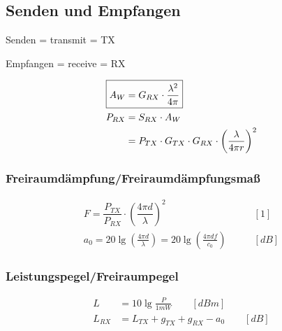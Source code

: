 \subsection{Senden und Empfangen}
\begin{description}
    \item Senden = transmit = TX
    \item Empfangen = receive = RX
\end{description}

\begin{align*}
    \Aboxed{A_W & = G_{RX}\cdot\frac{\lambda^2}{4\pi}}                                     \\
    P_{RX}      & = S_{RX}\cdot A_W                                                        \\
                & = P_{TX}\cdot G_{TX}\cdot G_{RX}\cdot \left(\frac{\lambda}{4\pi r}\right)^2
\end{align*}

\subsubsection{Freiraumdämpfung/Freiraumdämpfungsmaß}
\begin{align*}
    F = \dfrac{P_{TX}}{P_{RX}} \cdot \left(\dfrac{4 \pi d}{\lambda}\right)^2 &\qquad [1] \\ 
    a_{0} = 20 \lg \left(\frac{4 \pi d}{\lambda}\right) =20 \lg \left(\frac{4 \pi d f}{c_{0}}\right)   &\qquad [\si{dB}]
\end{align*}

\subsubsection{Leistungspegel/Freiraumpegel}
\begin{align*}  
    L &= 10 \lg \frac{P}{1 mW} \qquad [\si{dBm}] \\
    L_{RX} &= L_{TX}+g_{TX}+g_{RX}-a_{0} \qquad [\si{dB}]
\end{align*}